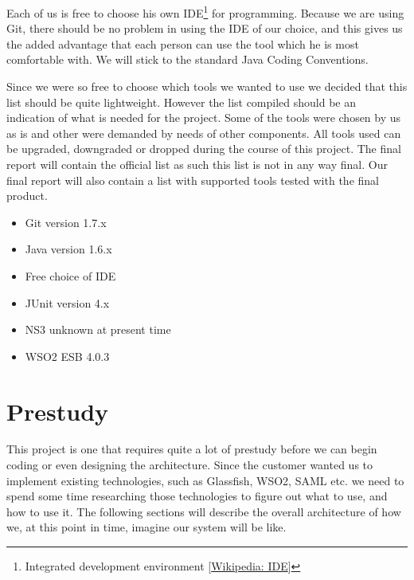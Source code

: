 \documentclass[12pt]{article}
\begin{document}
    Each of us is free to choose his own IDE\footnote
        {Integrated development environment [\href{http://en.wikipedia.org/wiki/Integrated_development_environment}{Wikipedia: IDE}]} for programming. Because we are using Git, there should be no problem in using the IDE of our choice, and this gives us the added advantage that each person can use the tool which he is most comfortable with. We will stick to the standard Java Coding Conventions.
    
    Since we were so free to choose which tools we wanted to use we decided that this list should be quite lightweight. However the list compiled should be an indication of what is needed for the project. Some of the tools were chosen by us as is and other were demanded by needs of other components. All tools used can be  upgraded, downgraded or dropped during the course of this project. The final report will contain the official list as such this list is not in any way final. Our final report will also contain a list with supported tools tested with the final product.
    \begin{itemize}
        \item Git version 1.7.x
        \item Java version 1.6.x
        \item Free choice of IDE
        \item JUnit version 4.x
        \item NS3 unknown at present time
        \item WSO2 ESB 4.0.3
    \end{itemize}
    
\section{Prestudy}\label{prestudy} This project is one that requires quite a lot of prestudy before we can begin coding or even designing the architecture. Since the customer wanted us to implement existing technologies, such as Glassfish, WSO2, SAML etc. we need to spend some time researching those technologies to figure out what to use, and how to use it. The following sections will describe the overall architecture of how we, at this point in time, imagine our system will be like. 
\end{document}
